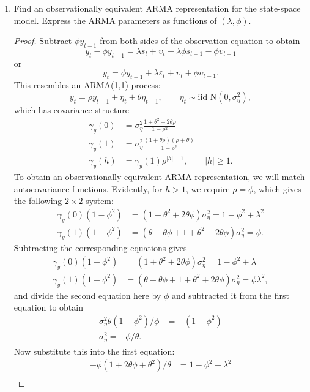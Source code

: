 \documentclass[oneside,reqno]{amsart}
\newcommand{\eps}{\varepsilon}
\newcommand{\ups}{\upsilon}
\newcommand{\N}{\mathrm N}
\theoremstyle{definition}
\begin{document}
\begin{enumerate}
\item
Find an observationally equivalent ARMA representation for the state-space model. Express the ARMA parameters as functions of $(\lambda, \phi)$. 

\begin{proof}
Subtract $\phi y_{t-1}$ from both sides of the observation equation to obtain 
\[
	y_t - \phi y_{t-1} = \lambda s_t + \ups_t - \lambda \phi s_{t-1} - \phi \ups_{t-1} 
\]	
or 
\[
	y_t = \phi y_{t-1} + \lambda \eps_t + \ups_t + \phi \ups_{t-1}.
\]
This resembles an ARMA(1,1) process:
\[
	y_t = \rho y_{t-1} + \eta_t + \theta \eta_{t-1}, 
	\qquad \eta_t  \sim \text{iid } \N(0, \sigma_\eta^2),
\]
which has covariance structure 
\begin{align*}
	\gamma_y(0) &= \sigma_\eta^2 \frac{1+\theta^2 + 2 \theta \rho}{1-\rho^2}  \\
	\gamma_y(1) &= \sigma_\eta^2\frac{(1+  \theta \rho)(\rho +\theta)}{1-\rho^2}\\
	\gamma_y(h) &= \gamma_y(1)  \rho^{|h|-1}, \qquad |h| \geq 1.
\end{align*}
To obtain an observationally equivalent ARMA representation, we will match autocovariance functions. Evidently, for $h>1$, we require $\rho = \phi$, which gives the following $2 \times 2$ system:
\begin{align*}
	\gamma_y(0)(1-\phi^2) &= (1+\theta^2 + 2 \theta \phi) \sigma_\eta^2  = 1-\phi^2 + \lambda^2 \\
	\gamma_y(1)(1-\phi^2) &= (\theta - \theta \phi + 1 + \theta^2 + 2 \theta \phi) \sigma_\eta^2  = \phi.
\end{align*}
Subtracting the corresponding equations gives 
\begin{align*}
	\gamma_y(0)(1-\phi^2) &= (1+\theta^2 + 2 \theta \phi) \sigma_\eta^2  = 1-\phi^2+ \lambda \\
	\gamma_y(1)(1-\phi^2) &= (\theta - \theta \phi + 1 + \theta^2 + 2 \theta \phi) \sigma_\eta^2  = \phi \lambda^2,
\end{align*}
and divide the second equation here by $\phi$ and subtracted it from the first equation to obtain 
\begin{align*}
	\sigma_\eta^2\theta(1-\phi^2)/\phi &= - (1-\phi^2) \\
	\sigma_\eta^2 = -\phi/\theta.
\end{align*}
Now substitute this into the first equation:
\begin{align*}
	-\phi(1 + 2 \theta\phi + \theta^2 )/ \theta &= 1 - \phi^2 + \lambda^2 \\

\end{align*}
\end{proof}
\end{enumerate}
\end{document}

